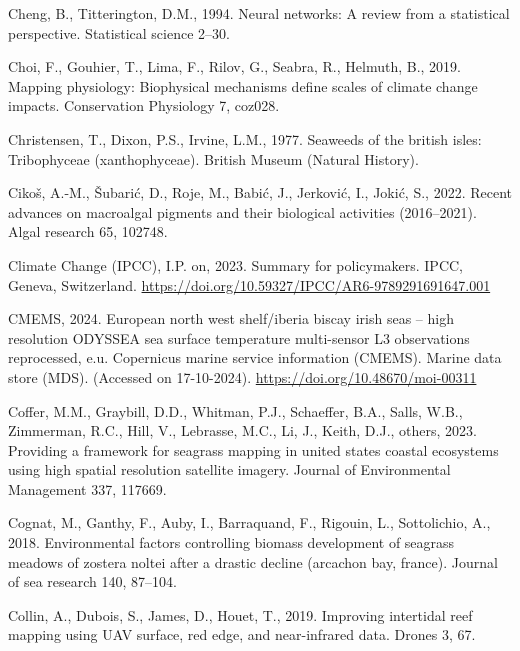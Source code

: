 \documentclass[
  letterpaper,
  11pt,
  english,
  singlespacing,
  headsepline]{MastersDoctoralThesis}
\newlength{\cslhangindent}
\newenvironment{CSLReferences}[2] %
 {\begin{list}{}{%
  \setlength{\itemindent}{0pt}
  \setlength{\leftmargin}{0pt}
  \setlength{\parsep}{0pt}
  \ifodd #1
   \setlength{\leftmargin}{\cslhangindent}
   \setlength{\itemindent}{-1\cslhangindent}
  \fi
  \setlength{\itemsep}{#2\baselineskip}}}
 {\end{list}}
\begin{document}
\begin{CSLReferences}{1}{0}
Cheng, B., Titterington, D.M., 1994. Neural networks: A review from a
statistical perspective. Statistical science 2--30.

Choi, F., Gouhier, T., Lima, F., Rilov, G., Seabra, R., Helmuth, B.,
2019. Mapping physiology: Biophysical mechanisms define scales of
climate change impacts. Conservation Physiology 7, coz028.

Christensen, T., Dixon, P.S., Irvine, L.M., 1977. Seaweeds of the
british isles: Tribophyceae (xanthophyceae). British Museum (Natural
History).

Cikoš, A.-M., Šubarić, D., Roje, M., Babić, J., Jerković, I., Jokić, S.,
2022. Recent advances on macroalgal pigments and their biological
activities (2016--2021). Algal research 65, 102748.

Climate Change (IPCC), I.P. on, 2023. Summary for policymakers. IPCC,
Geneva, Switzerland.
\url{https://doi.org/10.59327/IPCC/AR6-9789291691647.001}

CMEMS, 2024. European north west shelf/iberia biscay irish seas -- high
resolution ODYSSEA sea surface temperature multi-sensor L3 observations
reprocessed, e.u. Copernicus marine service information (CMEMS). Marine
data store (MDS). (Accessed on 17-10-2024).
\url{https://doi.org/10.48670/moi-00311}

Coffer, M.M., Graybill, D.D., Whitman, P.J., Schaeffer, B.A., Salls,
W.B., Zimmerman, R.C., Hill, V., Lebrasse, M.C., Li, J., Keith, D.J.,
others, 2023. Providing a framework for seagrass mapping in united
states coastal ecosystems using high spatial resolution satellite
imagery. Journal of Environmental Management 337, 117669.

Cognat, M., Ganthy, F., Auby, I., Barraquand, F., Rigouin, L.,
Sottolichio, A., 2018. Environmental factors controlling biomass
development of seagrass meadows of zostera noltei after a drastic
decline (arcachon bay, france). Journal of sea research 140, 87--104.

Collin, A., Dubois, S., James, D., Houet, T., 2019. Improving intertidal
reef mapping using UAV surface, red edge, and near-infrared data. Drones
3, 67.


\end{CSLReferences}
\end{document}
